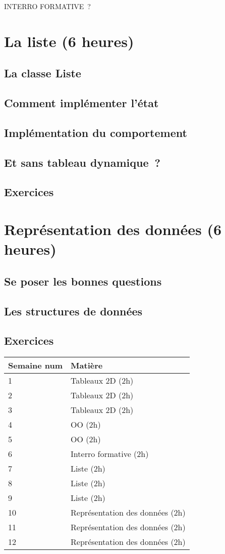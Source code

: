 \documentclass[a4paper]{article}
\begin{document}
INTERRO FORMATIVE~?

\section{La liste (6 heures)}

\subsection{La classe Liste}
\subsection{Comment implémenter l’état}
\subsection{Implémentation du comportement}
\subsection{Et sans tableau dynamique~?}
\subsection{Exercices}

\section{Représentation des données (6 heures)}

\subsection{Se poser les bonnes questions}
\subsection{Les structures de données}
\subsection{Exercices}

\newpage

\begin{tabular}{|l|l|}
	\hline
	Semaine num & Matière \\
	\hline
	1 &
	Tableaux 2D (2h)\\
	\hline
	2 &
	Tableaux 2D (2h)\\
	\hline
	3 &
	Tableaux 2D (2h)\\
	\hline
	4 &
	OO (2h)\\
	\hline
	5 &
	OO (2h)\\
	\hline
	6 &
	Interro formative (2h)\\
	\hline
	7 &
	Liste (2h)\\
	\hline
	8 &
	Liste (2h)\\
	\hline
	9 &
	Liste (2h)\\
	\hline
	10 &
	Représentation des données (2h)\\
	\hline
	11 &
	Représentation des données (2h)\\
	\hline
	12 &
	Représentation des données (2h)\\
	\hline
\end{tabular}
\end{document}
